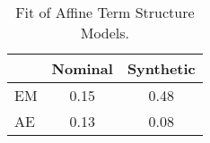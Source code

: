\begin{tiny}\begin{table}\centering\begin{tabular}{l|cc}\toprule & Nominal & Synthetic \\\midrule EM & 0.15 & 0.48 \\AE & 0.13 & 0.08 \\\bottomrule\end{tabular}\caption{Fit of Affine Term Structure Models.}\label{tab:rmse_atsm}\end{table}\end{tiny}